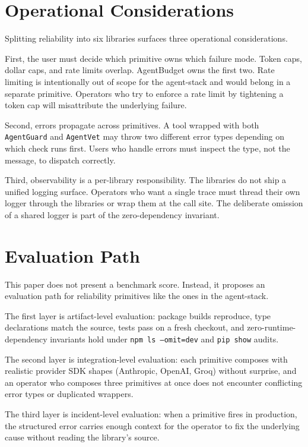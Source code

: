 \documentclass[11pt]{article}
\begin{document}
\section{Operational Considerations}


Splitting reliability into six libraries surfaces three operational considerations.

First, the user must decide which primitive owns which failure mode. Token caps, dollar caps, and rate limits overlap. AgentBudget owns the first two. Rate limiting is intentionally out of scope for the agent-stack and would belong in a separate primitive. Operators who try to enforce a rate limit by tightening a token cap will misattribute the underlying failure.

Second, errors propagate across primitives. A tool wrapped with both \texttt{AgentGuard} and \texttt{AgentVet} may throw two different error types depending on which check runs first. Users who handle errors must inspect the type, not the message, to dispatch correctly.

Third, observability is a per-library responsibility. The libraries do not ship a unified logging surface. Operators who want a single trace must thread their own logger through the libraries or wrap them at the call site. The deliberate omission of a shared logger is part of the zero-dependency invariant.

\section{Evaluation Path}


This paper does not present a benchmark score. Instead, it proposes an evaluation path for reliability primitives like the ones in the agent-stack.

The first layer is artifact-level evaluation: package builds reproduce, type declarations match the source, tests pass on a fresh checkout, and zero-runtime-dependency invariants hold under \texttt{npm ls --omit=dev} and \texttt{pip show} audits.

The second layer is integration-level evaluation: each primitive composes with realistic provider SDK shapes (Anthropic, OpenAI, Groq) without surprise, and an operator who composes three primitives at once does not encounter conflicting error types or duplicated wrappers.

The third layer is incident-level evaluation: when a primitive fires in production, the structured error carries enough context for the operator to fix the underlying cause without reading the library's source.
\end{document}
